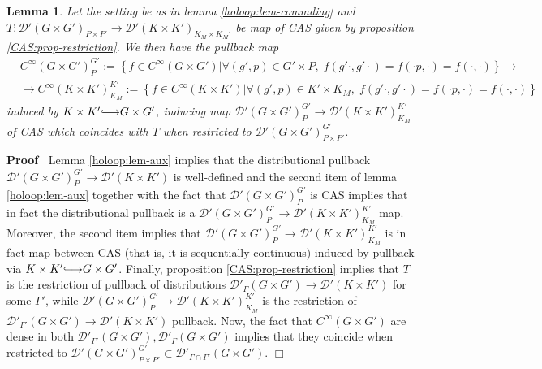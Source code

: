 \documentclass{article}
\newcommand{\assign}{:=}
\newcommand{\longhookrightarrow}{{\lhook\joinrel\relbar\joinrel\rightarrow}}
\newenvironment{proof}{\noindent\textbf{Proof\ }}{\hspace*{\fill}$\Box$\medskip}
\newtheorem{lemma}{Lemma}
\begin{document}
\begin{lemma}
  \label{holoop:lem-commdiag-aux1}Let the setting be as in lemma
  \ref{holoop:lem-commdiag} and $T : \mathcal{D}' (G \times G')_{P \times P'}
  \rightarrow \mathcal{D}' (K \times K')_{K_M \times K_M'}$ be map of CAS
  given by proposition \ref{CAS:prop-restriction}. We then have the pullback
  map
  \begin{eqnarray}
    & C^{\infty} (G \times G')^{G'}_P \assign \left\{ f \in C^{\infty} (G
    \times G') \big| \forall (g', p) \in G' \times P, \; f (g' \cdot, g'
    \cdot) = f (\cdot p, \cdot) = f (\cdot, \cdot) \right\} \rightarrow & 
    \nonumber\\
    & \rightarrow C^{\infty} (K \times K')_{K_M}^{K'} \assign \left\{ f \in
    C^{\infty} (K \times K') \big| \forall (g', p) \in K' \times K_M, \; f
    (g' \cdot, g' \cdot) = f (\cdot p, \cdot) = f (\cdot, \cdot) \right\} & 
    \nonumber
  \end{eqnarray}
  induced by $K \times K' \longhookrightarrow G \times G'$, inducing map
  $\mathcal{D}' (G \times G')^{G'}_P \rightarrow \mathcal{D}' (K \times
  K')_{K_M}^{K'}$ of CAS which coincides with $T$ when restricted to
  $\mathcal{D}' (G \times G')_{P \times P'}^{G'}$.
\end{lemma}

\begin{proof}
  Lemma \ref{holoop:lem-aux} implies that the distributional pullback
  $\mathcal{D}' (G \times G')^{G'}_P \rightarrow \mathcal{D}' (K \times K')$
  is well-defined and the second item of lemma \ref{holoop:lem-aux} together
  with the fact that $\mathcal{D}' (G \times G')^{G'}_P$ is CAS implies that
  in fact the distributional pullback is a $\mathcal{D}' (G \times G')^{G'}_P
  \rightarrow \mathcal{D}' (K \times K')_{K_M}^{K'}$ map. Moreover, the second
  item implies that $\mathcal{D}' (G \times G')_P^{G'} \rightarrow
  \mathcal{D}' (K \times K')_{K_M}^{K'}$ is in fact map between CAS (that is,
  it is sequentially continuous) induced by pullback via $K \times K'
  \longhookrightarrow G \times G'$. Finally, proposition
  \ref{CAS:prop-restriction} implies that $T$ is the restriction of pullback
  of distributions $\mathcal{D}'_{\Gamma} (G \times G') \rightarrow
  \mathcal{D}' (K \times K')$ for some $\Gamma'$, while $\mathcal{D}' (G
  \times G')^{G'}_P \rightarrow \mathcal{D}' (K \times K')_{K_M}^{K'}$ is the
  restriction of $\mathcal{D}'_{\Gamma'} (G \times G') \rightarrow
  \mathcal{D}' (K \times K')$ pullback. Now, the fact that $C^{\infty} (G
  \times G')$ are dense in both $\mathcal{D}'_{\Gamma'} (G \times G'),
  \mathcal{D}'_{\Gamma} (G \times G')$ implies that they coincide when
  restricted to $\mathcal{D}' (G \times G')_{P \times P'}^{G'} \subset
  \mathcal{D}'_{\Gamma \cap \Gamma'} (G \times G')$.
\end{proof}
\end{document}
